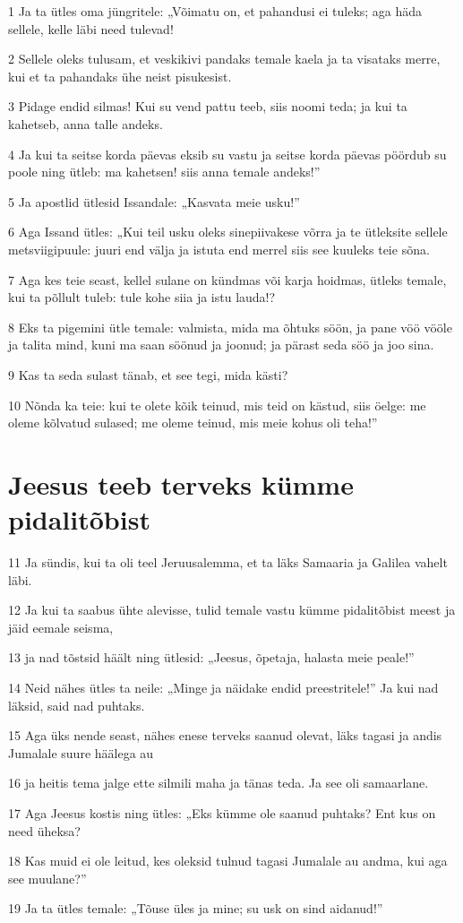 \par 1 Ja ta ütles oma jüngritele: „Võimatu on, et pahandusi ei tuleks; aga häda sellele, kelle läbi need tulevad!
\par 2 Sellele oleks tulusam, et veskikivi pandaks temale kaela ja ta visataks merre, kui et ta pahandaks ühe neist pisukesist.
\par 3 Pidage endid silmas! Kui su vend pattu teeb, siis noomi teda; ja kui ta kahetseb, anna talle andeks.
\par 4 Ja kui ta seitse korda päevas eksib su vastu ja seitse korda päevas pöördub su poole ning ütleb: ma kahetsen! siis anna temale andeks!”
\par 5 Ja apostlid ütlesid Issandale: „Kasvata meie usku!”
\par 6 Aga Issand ütles: „Kui teil usku oleks sinepiivakese võrra ja te ütleksite sellele metsviigipuule: juuri end välja ja istuta end merrel siis see kuuleks teie sõna.
\par 7 Aga kes teie seast, kellel sulane on kündmas või karja hoidmas, ütleks temale, kui ta põllult tuleb: tule kohe siia ja istu lauda!?
\par 8 Eks ta pigemini ütle temale: valmista, mida ma õhtuks söön, ja pane vöö vööle ja talita mind, kuni ma saan söönud ja joonud; ja pärast seda söö ja joo sina.
\par 9 Kas ta seda sulast tänab, et see tegi, mida kästi?
\par 10 Nõnda ka teie: kui te olete kõik teinud, mis teid on kästud, siis öelge: me oleme kõlvatud sulased; me oleme teinud, mis meie kohus oli teha!”

\section*{Jeesus teeb terveks kümme pidalitõbist}

\par 11 Ja sündis, kui ta oli teel Jeruusalemma, et ta läks Samaaria ja Galilea vahelt läbi.
\par 12 Ja kui ta saabus ühte alevisse, tulid temale vastu kümme pidalitõbist meest ja jäid eemale seisma,
\par 13 ja nad tõstsid häält ning ütlesid: „Jeesus, õpetaja, halasta meie peale!”
\par 14 Neid nähes ütles ta neile: „Minge ja näidake endid preestritele!” Ja kui nad läksid, said nad puhtaks.
\par 15 Aga üks nende seast, nähes enese terveks saanud olevat, läks tagasi ja andis Jumalale suure häälega au
\par 16 ja heitis tema jalge ette silmili maha ja tänas teda. Ja see oli samaarlane.
\par 17 Aga Jeesus kostis ning ütles: „Eks kümme ole saanud puhtaks? Ent kus on need üheksa?
\par 18 Kas muid ei ole leitud, kes oleksid tulnud tagasi Jumalale au andma, kui aga see muulane?”
\par 19 Ja ta ütles temale: „Tõuse üles ja mine; su usk on sind aidanud!”

